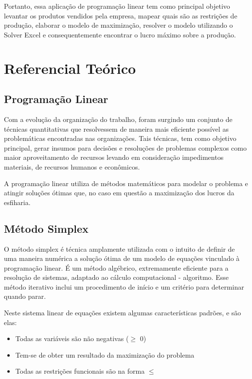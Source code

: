 \documentclass[
	12pt,				%
	openright,			%
	oneside,			%
	a4paper,			%
	english,			%
	french,				%
	spanish,			%
	brazil				%
	]{abntex2}
\begin{document}
	Portanto, essa aplicação de programação linear tem como principal objetivo levantar os produtos vendidos pela empresa, mapear quais são as restrições de produção, elaborar o modelo de maximização, resolver o modelo utilizando o Solver Excel e consequentemente encontrar o lucro máximo sobre a produção.


\part{Referencial Teórico}

\chapter{Programação Linear}

	Com a evolução da organização do trabalho, foram surgindo um conjunto de técnicas quantitativas que resolvessem de maneira mais eficiente possível as problemáticas encontradas nas organizações. Tais técnicas, tem como objetivo principal, gerar insumos para decisões e resoluções de problemas complexos como maior aproveitamento de recursos levando em consideração impedimentos materiais, de recursos humanos e econômicos. 

	A programação linear utiliza de métodos matemáticos para modelar o problema e atingir soluções ótimas que, no caso em questão a maximização dos lucros da esfiharia.

\chapter{Método Simplex}

O método simplex é técnica amplamente utilizada com o intuito de definir de uma maneira numérica a solução ótima de um modelo de equações vinculado à programação linear. É um método algébrico, extremamente eficiente para a resolução de sistemas, adaptado ao cálculo computacional - algoritmo. Esse método iterativo inclui um procedimento de início e um critério para determinar quando parar. \cite{unesp}
	
	Neste sistema linear de equações existem algumas características padrões, e são elas:

\begin{itemize}
\item Todas as variáveis são não negativas ($\geq$ 0)
\item Tem-se de obter um resultado da maximização do problema
\item Todas as restrições funcionais  são na forma $\leq$
\end{itemize}
\end{document}
